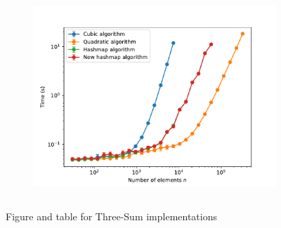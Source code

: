 \documentclass[12pt, a4paper]{article}
\begin{document}
\begin{figure}[H]
  \begin{subfigure}{0.59\textwidth} 
    \includegraphics[width=\textwidth]{three_sum.pdf}
    \label{fig:threeruntimes}
  \end{subfigure}
  \hfill
  \begin{subfigure}{0.40\textwidth}
    \begin{adjustbox}{max width=\textwidth}
      \begin{tabular}{|c|c|c|c|}
        
      \end{tabular}
    \end{adjustbox}
    \label{tbl:three_average}
  \end{subfigure}
  \caption{Figure and table for Three-Sum implementations}
  \label{threesumTableFigure}
\end{figure}
\end{document}
